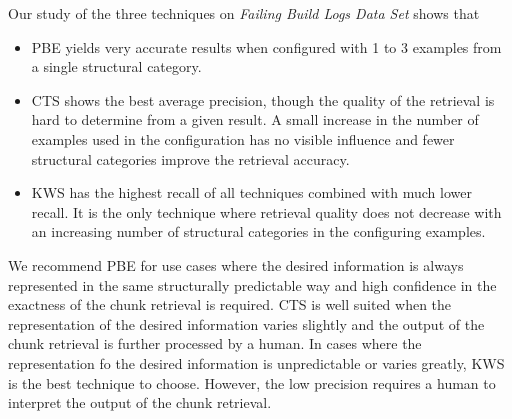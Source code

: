 \documentclass[\myrootdir/main.tex]{subfiles}
\begin{document}
Our study of the three techniques on \emph{Failing Build Logs Data Set} shows that
\begin{itemize}
  \item PBE yields very accurate results when configured with 1 to 3 examples from a single structural category.
  \item CTS shows the best average precision, though the quality of the retrieval is hard to determine from a given result.
  A small increase in the number of examples used in the configuration has no visible influence and fewer structural categories improve the retrieval accuracy.
  \item KWS has the highest recall of all techniques combined with much lower recall.
  It is the only technique where retrieval quality does not decrease with an increasing number of structural categories in the configuring examples.
\end{itemize}
We recommend PBE for use cases where the desired information is always represented in the same structurally predictable way and high confidence in the exactness of the chunk retrieval is required.
CTS is well suited when the representation of the desired information varies slightly and the output of the chunk retrieval is further processed by a human.
In cases where the representation fo the desired information is unpredictable or varies greatly, KWS is the best technique to choose.
However, the low precision requires a human to interpret the output of the chunk retrieval.
\end{document}
